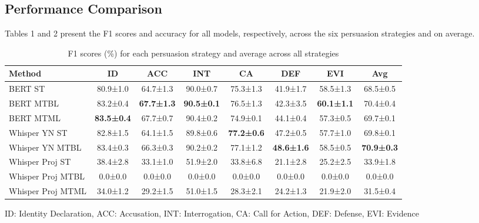 \documentclass{article}
\begin{document}
\subsection{Performance Comparison}
Tables 1 and 2 present the F1 scores and accuracy for all models, respectively, across the six persuasion strategies and on average.

\begin{table}[ht]
\centering
\small
\caption{F1 scores (\%) for each persuasion strategy and average across all strategies}
\setlength{\tabcolsep}{4pt}
\begin{tabular}{@{}lccccccc@{}}
\toprule
Method & ID & ACC & INT & CA & DEF & EVI & Avg \\
\midrule
BERT ST & 80.9±1.0 & 64.7±1.3 & 90.0±0.7 & 75.3±1.3 & 41.9±1.7 & 58.5±1.3 & 68.5±0.5 \\
BERT MTBL & 83.2±0.4 & \textbf{67.7±1.3} & \textbf{90.5±0.1} & 76.5±1.3 & 42.3±3.5 & \textbf{60.1±1.1} & 70.4±0.4 \\
BERT MTML & \textbf{83.5±0.4} & 67.7±0.7 & 90.4±0.2 & 74.9±0.1 & 44.1±0.4 & 57.3±0.5 & 69.7±0.1 \\
Whisper YN ST & 82.8±1.5 & 64.1±1.5 & 89.8±0.6 & \textbf{77.2±0.6} & 47.2±0.5 & 57.7±1.0 & 69.8±0.1 \\
Whisper YN MTBL & 83.4±0.3 & 66.3±0.3 & 90.2±0.2 & 77.1±1.2 & \textbf{48.6±1.6} & 58.5±0.5 & \textbf{70.9±0.3} \\
Whisper Proj ST & 38.4±2.8 & 33.1±1.0 & 51.9±2.0 & 33.8±6.8 & 21.1±2.8 & 25.2±2.5 & 33.9±1.8 \\
Whisper Proj MTBL & 0.0±0.0 & 0.0±0.0 & 0.0±0.0 & 0.0±0.0 & 0.0±0.0 & 0.0±0.0 & 0.0±0.0 \\
Whisper Proj MTML & 34.0±1.2 & 29.2±1.5 & 51.0±1.5 & 28.3±2.1 & 24.2±1.3 & 21.9±2.0 & 31.5±0.4 \\
\bottomrule
\end{tabular}
\parbox{\textwidth}{\small ID: Identity Declaration, ACC: Accusation, INT: Interrogation, CA: Call for Action, DEF: Defense, EVI: Evidence}
\end{table}
\end{document}
